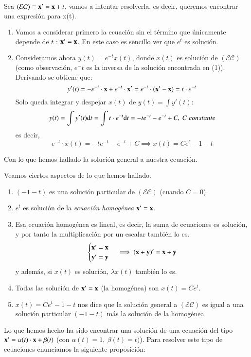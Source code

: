\begin{eg}\label{eg:lineal-order}
    Sea $\mathcal{(EC)} \equiv \mathbf{x'} = \mathbf{x} + t$, vamos a intentar resolverla, es decir, queremos encontrar una expresión para x(t).\\
    \begin{enumerate}
        \item Vamos a considerar primero la ecuación sin el término que únicamente depende de $t$ : $\mathbf{x}' = \mathbf{x}$. En este caso es sencillo ver que $e^t$ es solución.

        \item Consideramos ahora $y(t) = e^{-t}x(t)$, donde $x(t)$ es solución de $\mathcal{(EC)}$ (como observación, $e^-t$ es la inversa de la solución encontrada en (1)). Derivando se obtiene que:
        $$
            y'(t) = -e^{-t}\cdot \mathbf{x} + e^{-t} \cdot \mathbf{x'} = e^{-t} \cdot (\mathbf{x'}  - \mathbf{x}) = t \cdot e^{-t}
        $$
        Solo queda integrar y despejar $x(t)$ de $y(t) = \int y'(t)$:
        $$
            y(t) = \int y'(t) \mathrm{d} t = \int t \cdot e^{-t} \mathrm{d} t = -te^{-t} - e^{-t} + C,\ C\ constante
        $$
        es decir,
        $$
            e^{-t} \cdot x(t) = -te^{-t} - e^{-t} + C \implies x(t) = Ce^t - 1 - t
        $$
    \end{enumerate}
    Con lo que hemos hallado la solución general a nuestra ecuación.
\end{eg}
\begin{obs}
    Veamos ciertos aspectos de lo que hemos hallado.\\
    \begin{enumerate}
        \item $(-1-t)$ es una solución particular de $\mathcal{(EC)}$ (cuando $C=0$).
        \item $e^t$ es solución de la \textit{ecuación homogénea} $\mathbf{x'} = \mathbf{x}$.
        \item Esa ecuación homogénea es lineal, es decir, la suma de ecuaciones es solución, y por tanto la multiplicación por un escalar también lo es.
        $$
        \begin{cases}
            \mathbf{x'} = \mathbf{x}\\ \mathbf{y'} = \mathbf{y}
        \end{cases}
        \implies (\mathbf{x}+\mathbf{y})' = \mathbf{x} + \mathbf{y}
        $$
        y además, si $x(t)$ es solución, $\lambda x(t)$ también lo es.
        \item Todas las solución de $\mathbf{x'} = \mathbf{x}$ (la homogénea) son $x(t) = Ce^t$.
        \item $x(t) = Ce^t - 1 - t$ nos dice que la solución general a $\mathcal{(EC)}$ es igual a una solución particular $(-1-t)$ más la solución de la homogénea.
    \end{enumerate}
\end{obs}
Lo que hemos hecho ha sido encontrar una solución de una ecuación del tipo $\mathbf{x'} = \alpha(t)\cdot\mathbf{x}+\beta(t)$ (con $\alpha(t) = 1,\ \beta(t) = t)$). Para resolver este tipo de ecuaciones enunciamos la siguiente proposición:

